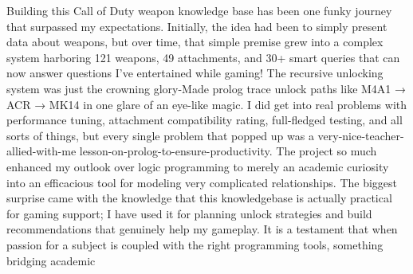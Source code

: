 \documentclass[12pt,a4paper]{article}
\begin{document}
Building this Call of Duty weapon knowledge base has been one funky journey
that surpassed my expectations. Initially, the idea had been to simply present
data about weapons, but over time, that simple premise grew into a complex
system harboring 121 weapons, 49 attachments, and 30+ smart queries that can
now answer questions I've entertained while gaming! The recursive unlocking
system was just the crowning glory-Made prolog trace unlock paths like M4A1 →
ACR → MK14 in one glare of an eye-like magic. I did get into real problems with
performance tuning, attachment compatibility rating, full-fledged testing, and
all sorts of things, but every single problem that popped up was a
very-nice-teacher-allied-with-me lesson-on-prolog-to-ensure-productivity. The
project so much enhanced my outlook over logic programming to merely an
academic curiosity into an efficacious tool for modeling very complicated
relationships. The biggest surprise came with the knowledge that this
knowledgebase is actually practical for gaming support; I have used it for
planning unlock strategies and build recommendations that genuinely help my
gameplay. It is a testament that when passion for a subject is coupled with the
right programming tools, something bridging academic
\end{document}
